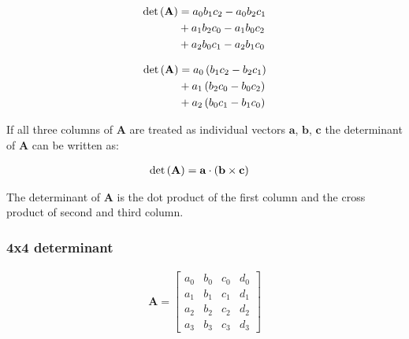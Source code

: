 \begin{align*}
\mathrm{det}\left(\mathbf{A}\right)
&
= a_0b_1c_2 - a_0b_2c_1 
\\&
+ a_1b_2c_0 - a_1b_0c_2 
\\&
+ a_2b_0c_1 - a_2b_1c_0
\end{align*}

\begin{align*}
\mathrm{det}\left(\mathbf{A}\right)
&
= a_0\left(b_1c_2 - b_2c_1\right)
\\&
+ a_1\left(b_2c_0 - b_0c_2\right)
\\&
+ a_2\left(b_0c_1 - b_1c_0\right)
\end{align*}

If all three columns of $\mathbf{A}$ are treated as individual vectors $\mathbf{a}$, $\mathbf{b}$, $\mathbf{c}$ the determinant of $\mathbf{A}$ can be written as:

\begin{align}
\label{eq:determinant3x3}
\mathrm{det}\left(\mathbf{A}\right)
&
= \mathbf{a} \cdot \left(\mathbf{b} \times \mathbf{c}\right)
\end{align}

The determinant of  $\mathbf{A}$ is the dot product of the first column and the cross product of second and third column.

\subsubsection{4x4 determinant}
\label{sec:determinant4x4}
\begin{align*}
\mathbf{A}
=
\begin{bmatrix}
a_0&b_0&c_0&d_0\\
a_1&b_1&c_1&d_1\\
a_2&b_2&c_2&d_2\\
a_3&b_3&c_3&d_3
\end{bmatrix}
\end{align*}


\begin{comment}

\begin{align*}
det\pth{\mathbf{A}}
&=
a_1b_2c_3d_4 
+ a_1b_3c_4d_2 
+ a_1b_4c_2d_3 
- a_1b_4c_3d_2
- a_1b_2c_4d_3\\
&- a_1b_3c_2d_4
- a_2b_1c_3d_4
- a_4b_1c_2d_3
- a_3b_1c_4d_2
+ a_4b_1c_3d_2\\
&+ a_2b_1c_4d_3
+ a_3b_1c_2d_4
+ a_2b_3c_1d_4
+ a_4b_2c_1d_3
+ a_3b_4c_1d_2\\
&- a_4b_3c_1d_2
- a_2b_4c_1d_3
- a_3b_2c_1d_4
- a_2b_3c_4d_1
- a_4b_2c_3d_1\\
&- a_3b_4c_2d_1
+ a_4b_3c_2d_1
+ a_2b_4c_3d_1
+ a_3b_2c_4d_1           
\end{align*}

\end{comment}

